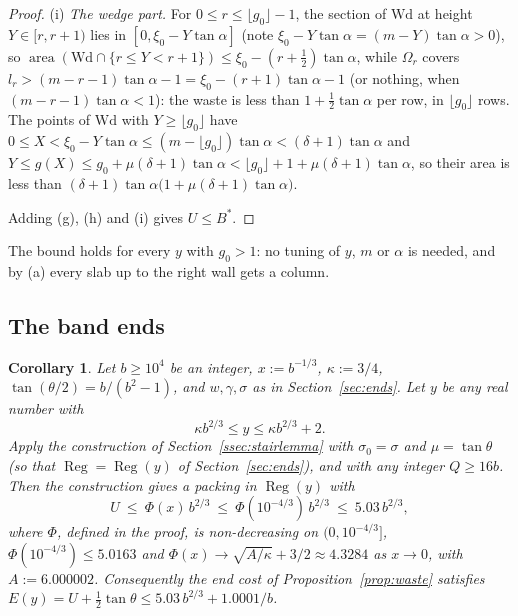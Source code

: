 \documentclass[11pt]{amsart}
\newcommand{\Reg}{\operatorname{Reg}}
\newcommand{\ta}{\tan\alpha}
\newtheorem{corollary}[theorem]{Corollary}
\theoremstyle{definition}
\theoremstyle{remark}
\numberwithin{equation}{section}
\begin{document}
\begin{proof}
(i) \emph{The wedge part.} For $0\le r\le\lfloor g_0\rfloor-1$, the section of $\mathrm{Wd}$ at height $Y\in[r,r+1)$ lies
in $[0,\xi_0-Y\ta]$ (note $\xi_0-Y\ta=(m-Y)\ta>0$), so
$\operatorname{area}(\mathrm{Wd}\cap\{r\le Y<r+1\})\le\xi_0-(r+\frac12)\ta$, while $\Omega_r$ covers
$l_r>(m-r-1)\ta-1=\xi_0-(r+1)\ta-1$ (or nothing, when $(m-r-1)\ta<1$): the waste is less than $1+\frac12\ta$ per row,
in $\lfloor g_0\rfloor$ rows. The points of $\mathrm{Wd}$ with $Y\ge\lfloor g_0\rfloor$ have
$0\le X<\xi_0-Y\ta\le(m-\lfloor g_0\rfloor)\ta<(\delta+1)\ta$ and
$Y\le g(X)\le g_0+\mu(\delta+1)\ta<\lfloor g_0\rfloor+1+\mu(\delta+1)\ta$, so their area is less than
$(\delta+1)\ta\bigl(1+\mu(\delta+1)\ta\bigr)$.

Adding (g), (h) and (i) gives $U\le B^*$.
\end{proof}

The bound holds for every $y$ with $g_0>1$: no tuning of $y$, $m$ or $\alpha$ is needed, and by (a) every slab up to
the right wall gets a column.

\subsection{The band ends}\label{ssec:b23}

\begin{corollary}\label{cor:b23}
Let $b\ge10^4$ be an integer, $x:=b^{-1/3}$, $\kappa:=3/4$, $\tan(\theta/2)=b/(b^2-1)$, and $w,\gamma,\sigma$ as in
Section~\ref{sec:ends}. Let $y$ be any real number with
\[
\kappa b^{2/3}\le y\le\kappa b^{2/3}+2 .
\]
Apply the construction of Section~\ref{ssec:stairlemma} with $\sigma_0=\sigma$ and $\mu=\tan\theta$ (so that
$\Reg=\Reg(y)$ of Section~\ref{sec:ends}), and with any integer $Q\ge16b$. Then the construction gives a packing in
$\Reg(y)$ with
\[
U\ \le\ \Phi(x)\,b^{2/3}\ \le\ \Phi(10^{-4/3})\,b^{2/3}\ \le\ 5.03\,b^{2/3},
\]
where $\Phi$, defined in the proof, is non-decreasing on $(0,10^{-4/3}]$, $\Phi(10^{-4/3})\le5.0163$ and
$\Phi(x)\to\sqrt{A/\kappa}+3/2\approx4.3284$ as $x\to0$, with $A:=6.000002$. Consequently the end cost of
Proposition~\ref{prop:waste} satisfies $E(y)=U+\frac12\tan\theta\le5.03\,b^{2/3}+1.0001/b$.
\end{corollary}
\end{document}

